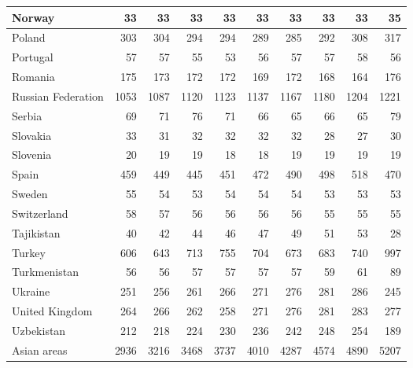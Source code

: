 \begin{table}
\begin{tabular}{|l|r|r|r|r|r|r|r|r|r|}
                        Norway&     33&     33&     33&     33&     33&     33&     33&     33&     35\\\hline
                        Poland&    303&    304&    294&    294&    289&    285&    292&    308&    317\\\hline
                      Portugal&     57&     57&     55&     53&     56&     57&     57&     58&     56\\\hline
                       Romania&    175&    173&    172&    172&    169&    172&    168&    164&    176\\\hline
            Russian Federation&   1053&   1087&   1120&   1123&   1137&   1167&   1180&   1204&   1221\\\hline
                        Serbia&     69&     71&     76&     71&     66&     65&     66&     65&     79\\\hline
                      Slovakia&     33&     31&     32&     32&     32&     32&     28&     27&     30\\\hline
                      Slovenia&     20&     19&     19&     18&     18&     19&     19&     19&     19\\\hline
                         Spain&    459&    449&    445&    451&    472&    490&    498&    518&    470\\\hline
                        Sweden&     55&     54&     53&     54&     54&     54&     53&     53&     53\\\hline
                   Switzerland&     58&     57&     56&     56&     56&     56&     55&     55&     55\\\hline
                    Tajikistan&     40&     42&     44&     46&     47&     49&     51&     53&     28\\\hline
                        Turkey&    606&    643&    713&    755&    704&    673&    683&    740&    997\\\hline
                  Turkmenistan&     56&     56&     57&     57&     57&     57&     59&     61&     89\\\hline
                       Ukraine&    251&    256&    261&    266&    271&    276&    281&    286&    245\\\hline
                United Kingdom&    264&    266&    262&    258&    271&    276&    281&    283&    277\\\hline
                    Uzbekistan&    212&    218&    224&    230&    236&    242&    248&    254&    189\\\hline
                   Asian areas&   2936&   3216&   3468&   3737&   4010&   4287&   4574&   4890&   5207\\\hline

\end{tabular}
\end{table}
